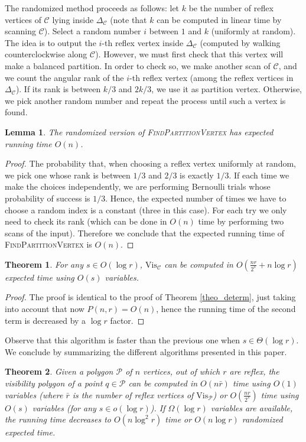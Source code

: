 \documentclass[a4paper]{article}
\newtheorem{lemma}{Lemma}
\newtheorem{theorem}{Theorem}
\newcommand{\Poly}{\ensuremath{\mathcal{P}}}               \newcommand{\bd}{\ensuremath{\partial \Poly} }                 \newcommand{\Vis}{\ensuremath{\mathrm{Vis}_\Poly}} \newcommand{\VisC}{\ensuremath{\mathrm{Vis}_{\mathcal{C}}}} \newcommand{\VisCprime}{\ensuremath{\mathrm{Vis}_{\mathcal{C'}}}} \newcommand{\E}{\ensuremath{\mathrm{E}}}                    \newcommand{\Rin}{\ensuremath{r}}      \newcommand{\Rout}{\ensuremath{\bar{r}}}      \newcommand{\Hout}{\ensuremath{\bar{h}}}      \newcommand{\chain}{\ensuremath{{\mathrm{Chain}}}}     \newcommand{\region}{\ensuremath{{{\mathcal R}}}}
\newcommand{\coneC}{\ensuremath{{{\Delta_{\mathcal C}}}}}
\newcommand{\C}{\ensuremath{{\mathcal C}}}
\begin{document}
The randomized method proceeds as follows: let $k$ be the  number of reflex vertices of $\C$ lying inside $\coneC$ (note that $k$ can be computed in linear time by scanning $\C$). Select a random number $i$ between $1$ and $k$ (uniformly at random). The idea is to output the $i$-th reflex vertex inside $\coneC$ (computed by walking counterclockwise along $\C$). However, we must first check that this vertex will make a balanced partition. In order to check so, we make another scan of $\mathcal C$, and we count the angular rank of the $i$-th reflex vertex (among the reflex vertices in $\coneC$). If its rank is between $k/3$ and  $2k/3$, we use it as partition vertex. Otherwise, we pick another random number and repeat the process until such a vertex is found.

\begin{lemma}\label{lem_runningtime}
The randomized version of \textsc{FindPartitionVertex} has expected running time $O(n)$.
\end{lemma}
\begin{proof}
The probability that, when choosing a reflex vertex uniformly at random, we pick one whose rank is between $1/3$ and $2/3$ is exactly $1/3$. If each time we make the choices independently, we are performing Bernoulli trials whose probability of success is $1/3$. Hence, the expected number of times we have to choose a random index is a constant (three in this case). For each try we only need to check its rank (which can be done in $O(n)$ time by performing two scans of the input).
Therefore we conclude that the expected running time of \textsc{FindPartitionVertex} is $O(n)$.
\end{proof}
 

\begin{theorem}\label{theo_randomi}
For any $s\in O(\log r)$, $\VisC$  can be computed in $O(\frac{nr}{2^{s}}+n\log r)$ expected time using $O(s)$ variables.
\end{theorem}
\begin{proof}
The proof is identical to the proof of Theorem \ref{theo_determ}, just taking into account that now $P(n,r)=O(n)$, hence the running time of the second term is decreased by a $\log r$ factor. 
\end{proof}


Observe that this algorithm is faster than the previous one when $s\in \Theta(\log r)$.
We conclude by summarizing the different algorithms presented in this paper. 

\begin{theorem}
Given a polygon $\Poly$ of $n$ vertices, out of which $r$ are reflex, the visibility polygon of a point $q\in\Poly$ can be computed in $O(n\Rout)$ time using $O(1)$ variables (where $\Rout$ is the number of reflex vertices of $\Vis$) or $O(\frac{nr}{2^{s}})$ time using $O(s)$ variables (for any $s\in o(\log r)$). If $\Omega(\log r)$ variables are available, the running time decreases to $O(n\log^2 r)$ time or $O(n\log r)$ randomized expected time.
\end{theorem}








 








\end{document}
